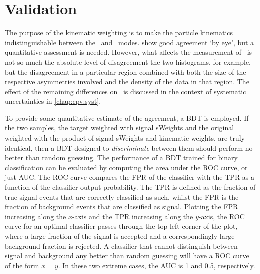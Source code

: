 \section{Validation}
\label{chap:cpv:kinematic_weighting:validation}

The purpose of the kinematic weighting is to make the particle kinematics 
indistinguishable between the \pKK\ and \ppipi\ modes.
show good agreement `by eye', but a quantitative assessment is needed.
However, what affects the measurement of \dACP\ is not so much the absolute 
level of disagreement the two histograms, for example, but the disagreement in 
a particular region combined with both the size of the respective asymmetries 
involved and the density of the data in that region.
The effect of the remaining differences on \dACP\ is discussed in the context 
of systematic uncertainties in \cref{chap:cpv:syst}.

To provide some quantitative estimate of the agreement, a \ac{BDT} is employed.
If the two samples, the target weighted with signal sWeights and the original 
weighted with the product of signal sWeights and kinematic weights, are truly 
identical, then a \ac{BDT} designed to \emph{discriminate} between them should 
perform no better than random guessing.
The performance of a \ac{BDT} trained for binary classification can be 
evaluated by computing the area under the \ac{ROC} curve, or just \ac{AUC}.
The \ac{ROC} curve compares the \ac{FPR} of the classifier with the \ac{TPR} as 
a function of the classifier output probability.
The \ac{TPR} is defined as the fraction of true signal events that are 
correctly classified as such, whilst the \ac{FPR} is the fraction of background 
events that are classified as signal.
Plotting the \ac{FPR} increasing along the $x$-axis and the \ac{TPR} increasing 
along the $y$-axis, the \ac{ROC} curve for an optimal classifier passes through 
the top-left corner of the plot, where a large fraction of the signal is 
accepted and a correspondingly large background fraction is rejected.
A classifier that cannot distinguish between signal and background any better 
than random guessing will have a \ac{ROC} curve of the form $x = y$.
In these two extreme cases, the \ac{AUC} is 1 and 0.5, respectively.

